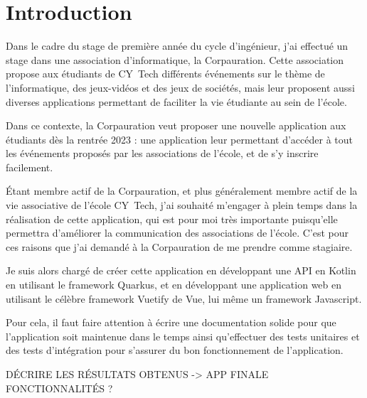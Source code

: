 
\section{Introduction}

Dans le cadre du stage de première année du cycle d'ingénieur, j'ai effectué un stage dans une association d'informatique, la Corpauration. Cette association propose aux étudiants de CY~Tech différents événements sur le thème de l'informatique, des jeux-vidéos et des jeux de sociétés, mais leur proposent aussi diverses applications permettant de faciliter la vie étudiante au sein de l'école.

Dans ce contexte, la Corpauration veut proposer une nouvelle application aux étudiants dès la rentrée 2023 : une application leur permettant d'accéder à tout les événements proposés par les associations de l'école, et de s'y inscrire facilement.

Étant membre actif de la Corpauration, et plus généralement membre actif de la vie associative de l'école CY~Tech, j'ai souhaité m'engager à plein temps dans la réalisation de cette application, qui est pour moi très importante puisqu'elle permettra d'améliorer la communication des associations de l'école. C'est pour ces raisons que j'ai demandé à la Corpauration de me prendre comme stagiaire.

\medskip

Je suis alors chargé de créer cette application en développant une API en Kotlin en utilisant le framework Quarkus, et en développant une application web en utilisant le célèbre framework Vuetify de Vue, lui même un framework Javascript.

Pour cela, il faut faire attention à écrire une documentation solide pour que l'application soit maintenue dans le temps ainsi qu'effectuer des tests unitaires et des tests d'intégration pour s'assurer du bon fonctionnement de l'application.

\medskip

DÉCRIRE LES RÉSULTATS OBTENUS -> APP FINALE FONCTIONNALITÉS ?